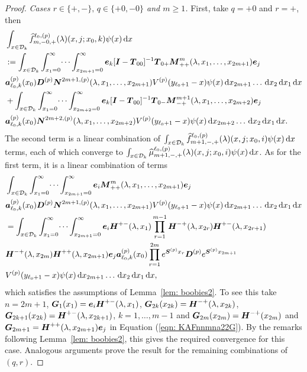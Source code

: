 \begin{proof}
	\textit{Cases \(r \in \{+,-\},\, q\in\{+0,-0\} \) and \(m\geq 1\).} First, take \(q=+0\) and \(r=+\), then 
	\begin{align}
		&\int_{x\in\mathcal{D}_k}\widehat{f}_{m,-0,+}^{\ell_0,(p)}(\lambda)(x,j;x_0,k)\psi(x)\, \mathrm{d} x \nonumber 
		\\&:=\int_{x\in\mathcal{D}_k}\int_{x_1=0}^\infty \dots \int_{x_{2m+1}=0}^\infty   \boldsymbol e_k [\boldsymbol I - \boldsymbol T_{00}]^{-1}\boldsymbol T_{0+}\boldsymbol M^m_{++}(\lambda,x_1,\dots,x_{2m+1})\boldsymbol e_j \nonumber
		\\& \boldsymbol a_{\ell_0,k}^{(p)}(x_0) \boldsymbol D^{(p)} \boldsymbol N^{2m+1,(p)}(\lambda,x_1,\dots,x_{2m+1}) V^{(p)}(y_{\ell_0+1}-x)\psi(x)\, \mathrm{d} x_{2m+1}\dots\, \mathrm{d} x_2 \, \mathrm{d} x_1  \, \mathrm{d} x\nonumber
		\\& + \int_{x\in\mathcal{D}_k}\int_{x_1=0}^\infty \dots \int_{x_{2m+2}=0}^\infty   \boldsymbol e_k [\boldsymbol I - \boldsymbol T_{00}]^{-1}\boldsymbol T_{0-}\boldsymbol M^{m+1}_{-+}(\lambda,x_1,\dots,x_{2m+2})\boldsymbol e_j \nonumber
		\\& \boldsymbol a_{\ell_0,k}^{(p)}(x_0)\boldsymbol N^{2m+2,(p)}(\lambda,x_1,\dots,x_{2m+2}) V^{(p)}(y_{\ell_0+1}-x)\psi(x)\, \mathrm{d} x_{2m+2}\dots\, \mathrm{d} x_2 \, \mathrm{d} x_1 \, \mathrm{d} x.
	\end{align}
	The second term is a linear combination of \(\int_{x\in\mathcal{D}_k}\widehat{f}_{m+1,-,+}^{\ell_0,(p)}(\lambda)(x,j;x_0,i) \psi(x)\, \mathrm{d} x\) terms, each of which converge to \(\int_{x\in\mathcal{D}_k}\widehat{\mu}_{m+1,-,+}^{\ell_0,(p)}(\lambda)(x,j;x_0,i) \psi(x)\, \mathrm{d} x\).
	As for the first term, it is a linear combination of terms 
	\begin{align*}
		&\int_{x\in\mathcal{D}_k}\int_{x_1=0}^\infty \dots \int_{x_{2m+1}=0}^\infty \boldsymbol e_i \boldsymbol M^m_{++}(\lambda,x_1,\dots,x_{2m+1})\boldsymbol e_j \nonumber
		\\& \boldsymbol a_{\ell_0,k}^{(p)}(x_0)\boldsymbol D^{(p)}\boldsymbol N^{2m+1,(p)}(\lambda,x_1,\dots,x_{2m+1}) V^{(p)}(y_{\ell_0+1}-x)\psi(x)\, \mathrm{d} x_{2m+1}\dots\, \mathrm{d} x_2 \, \mathrm{d} x_1 \, \mathrm{d} x
		\\&=\int_{x\in\mathcal{D}_k}\int_{x_1=0}^\infty \dots \int_{x_{2m+1}=0}^\infty \boldsymbol e_i \boldsymbol H^{+-}(\lambda,x_1)\prod_{r=1}^{m-1}\boldsymbol H^{-+}(\lambda,x_{2r}) \boldsymbol H^{+-}(\lambda,x_{2r+1}) \\&\boldsymbol H^{-+}(\lambda,x_{2m}) 
		\boldsymbol H^{++}(\lambda,x_{2m+1})\boldsymbol e_j \nonumber
		\boldsymbol a_{\ell_0,k}^{(p)}(x_0)\prod_{r=1}^{2m} e^{\boldsymbol{S}^{(p)}x_{r}}\boldsymbol{D}^{(p)} e^{\boldsymbol{S}^{(p)}x_{2m+1}}
		\\& V^{(p)}(y_{\ell_0+1}-x)\psi(x)\, \mathrm{d} x_{2m+1}\dots\, \mathrm{d} x_2 \, \mathrm{d} x_1 \, \mathrm{d} x,
	\end{align*}
	which satisfies the assumptions of Lemma~\ref{lem: boobies2}. To see this take \(n=2m+1\), \(\boldsymbol G_1(x_1) = \boldsymbol e_i\boldsymbol H^{+-}(\lambda, x_1)\), \(\boldsymbol G_{2k}(x_{2k}) = \boldsymbol H^{-+}(\lambda, x_{2k})\), \(\boldsymbol G_{2k+1}(x_{2k}) = \boldsymbol H^{+-}(\lambda, x_{2k+1})\), \(k=1,\dots,m-1\) and \(\boldsymbol G_{2m}(x_{2m}) = \boldsymbol H^{-+}(x_{2m})\) and \(\boldsymbol G_{2m+1} = \boldsymbol H^{++}(\lambda,x_{2m+1})\boldsymbol e_j\) in Equation (\ref{eqn: KAFnnmna22G}). By the remarks following Lemma~\ref{lem: boobies2}, this gives the required convergence for this case. Analogous arguments prove the result for the remaining combinations of \((q,r)\). 
\end{proof}

